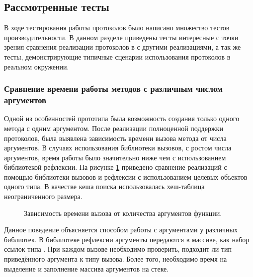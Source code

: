 \subsection{Рассмотренные тесты}
В ходе тестирования работы протоколов было написано множество тестов производительности. В данном разделе приведены тесты интересные с точки зрения сравнения реализации протоколов в  с другими реализациями, а так же тесты, демонстрирующие типичные сценарии использования протоколов в реальном окружении.

\subsubsection{Сравнение времени работы методов с различным числом аргументов}
Одной из особенностей прототипа была возможность создания только одного метода с одним аргументом. После реализации полноценной поддержки протоколов, была выявлена зависимость времени вызова метода от числа аргументов. В случаях использования библиотеки вызовов, с ростом числа аргументов, время работы было значительно ниже чем с использованием библиотекой рефлексии. На рисунке \ref{plot:bench:argsCount} приведено сравнение реализаций с помощью библиотеки вызовов и рефлексии с использованием целевых объектов одного типа. В качестве кеша поиска использовалась хеш-таблица неограниченного размера.

\begin{figure}[H]
\caption{\label{plot:bench:argsCount}Зависимость времени вызова от количества аргументов функции.}
\end{figure}

Данное поведение объясняется способом работы с аргументами у различных библиотек. В библиотеке рефлексии аргументы передаются в массиве, как набор ссылок типа . При каждом вызове необходимо проверить, подходит ли тип приведённого аргумента к типу вызова. Более того, необходимо время на выделение и заполнение массива аргументов на стеке.

